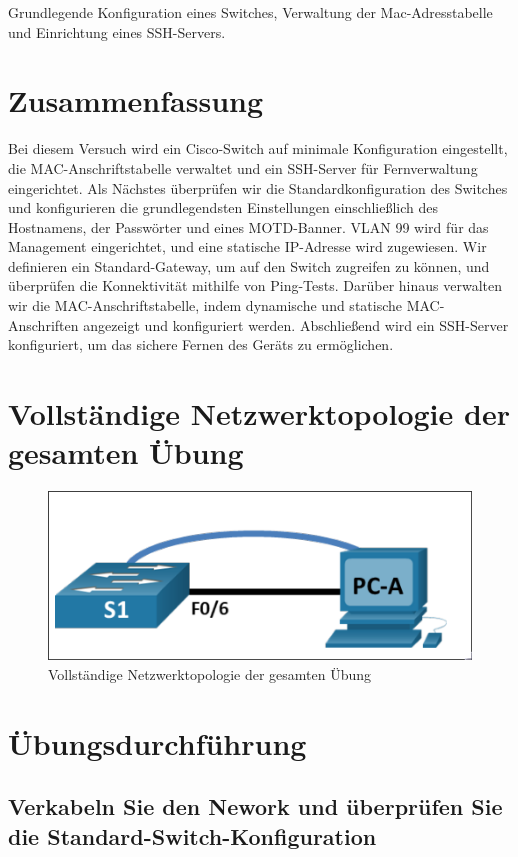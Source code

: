 \documentclass[a4paper]{article}
\begin{document}
Grundlegende Konfiguration eines Switches, Verwaltung der Mac-Adresstabelle und Einrichtung eines SSH-Servers.


\section{Zusammenfassung}
Bei diesem Versuch wird ein Cisco-Switch auf minimale Konfiguration eingestellt, die MAC-Anschriftstabelle verwaltet und ein SSH-Server für Fernverwaltung eingerichtet. Als Nächstes überprüfen wir die Standardkonfiguration des Switches und konfigurieren die grundlegendsten Einstellungen einschließlich des Hostnamens, der Passwörter und eines MOTD-Banner. VLAN 99 wird für das Management eingerichtet, und eine statische IP-Adresse wird zugewiesen. Wir definieren ein Standard-Gateway, um auf den Switch zugreifen zu können, und überprüfen die Konnektivität mithilfe von Ping-Tests. Darüber hinaus verwalten wir die MAC-Anschriftstabelle, indem dynamische und statische MAC-Anschriften angezeigt und konfiguriert werden. Abschließend wird ein SSH-Server konfiguriert, um das sichere Fernen des Geräts zu ermöglichen.
\newpage

\section{Vollständige Netzwerktopologie der gesamten Übung}

\begin{figure}[h]
	\centering
	\includegraphics[scale=1.5]{images/asfadsopfosdf.png}
	\caption{Vollständige Netzwerktopologie der gesamten Übung}
\end{figure}

\newpage

\section{Übungsdurchführung}
\subsection{Verkabeln Sie den Nework und überprüfen Sie die Standard-Switch-Konfiguration}
\end{document}
